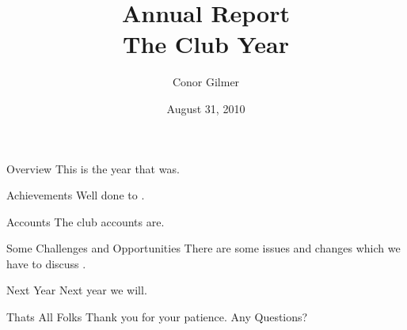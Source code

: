 \documentclass{beamer}
\title[Annual Report]{Annual Report\\The Club Year}
\author{Conor Gilmer}
\institute{The Club}
\date{August 31, 2010}
\begin{document}
\begin{frame}
\titlepage
\end{frame}

\begin{frame}{Overview}
This is the year that was.
\end{frame}

\begin{frame}{Achievements}
Well done to .
\end{frame}

\begin{frame}{Accounts}
The club accounts are.
\end{frame}

\begin{frame}{Some Challenges and Opportunities}
There are some issues and changes which we have to discuss .
\end{frame}

\begin{frame}{Next Year}
Next year we will.
\end{frame}

\begin{frame}{Thats All Folks}
Thank you for your patience. Any Questions?
\end{frame}
\end{document}
